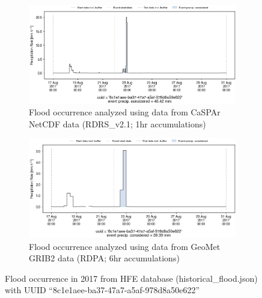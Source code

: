 \documentclass[10pt,a4paper,titlepage,parskip]{scrartcl}
\begin{document}
\begin{figure}[h]
	\begin{subfigure}[a]{1.0\textwidth}
		\centering
		\includegraphics[width=\linewidth]{figures/compare_Geomet_CaSPAr/interpolated_at_stations_occurrence_1157_identified-timesteps_RDRS_v2.1.png}
		\caption{Flood occurrence analyzed using data from CaSPAr NetCDF data (RDRS\_v2.1; 1hr accumulations)}
	\end{subfigure}
	\par\bigskip\bigskip
	\begin{subfigure}[b]{1.0\textwidth}
		\centering
		\includegraphics[width=\linewidth]{figures/compare_Geomet_CaSPAr/interpolated_at_stations_occurrence_1157_identified-timesteps_rdpa_10km_6f.png}
		\caption{Flood occurrence analyzed using data from GeoMet GRIB2 data (RDPA; 6hr accumulations)}
	\end{subfigure}
	\par\bigskip\bigskip
	\caption{Flood occurrence in 2017 from HFE database (historical\_flood.json) with UUID ``8c1e1aee-ba37-47a7-a5af-978d8a50e622''}
\end{figure}
\pagebreak
\end{document}
